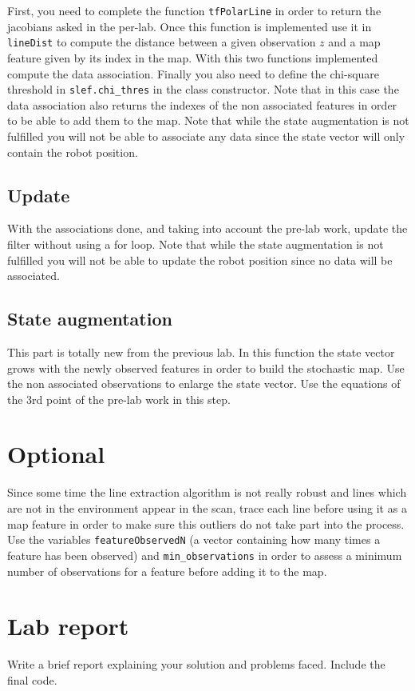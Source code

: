 \documentclass[a4paper,10pt]{article}
\begin{document}
First, you need to complete the function \texttt{tfPolarLine} in order to return the jacobians asked in the per-lab. Once this function is implemented use it in \texttt{lineDist} to compute the distance between a given observation $z$ and a map feature given by its index in the map. With this two functions implemented compute the data association. Finally you also need to define the chi-square threshold in \texttt{slef.chi\_thres} in the class constructor. Note that in this case the data association also returns the indexes of the non associated features in order to be able to add them to the map. Note that while the state augmentation is not fulfilled you will not be able to associate any data since the state vector will only contain the robot position.

\subsection{Update}
With the associations done, and taking into account the pre-lab work, update the filter without using a for loop. Note that while the state augmentation is not fulfilled you will not be able to update the robot position since no data will be associated.

\subsection{State augmentation}
This part is totally new from the previous lab. In this function the state vector grows with the newly observed features in order to build the stochastic map. Use the non associated observations to enlarge the state vector. Use the equations of the 3rd point of the pre-lab work in this step.

\section{Optional}
Since some time the line extraction algorithm is not really robust and lines which are not in the environment appear in the scan, trace each line before using it as a map feature in order to make sure this outliers do not take part into the process. Use the variables \texttt{featureObservedN} (a vector containing how many times a feature has been observed) and \texttt{min\_observations} in order to assess a minimum number of observations for a feature before adding it to the map.

\section{Lab report}
Write a brief report explaining your solution and problems faced. Include the final code.
\end{document}
